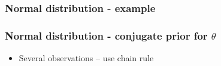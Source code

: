 \documentclass[english,t]{beamer}
\begin{document}
\begin{frame}
  \frametitle{Normal distribution - example}

  
\end{frame}

\begin{frame}
  \frametitle{Normal distribution - conjugate prior for $\theta$}

  \begin{itemize}
  \item Several observations -- use chain rule
  \end{itemize}

\end{frame}
\end{document}
